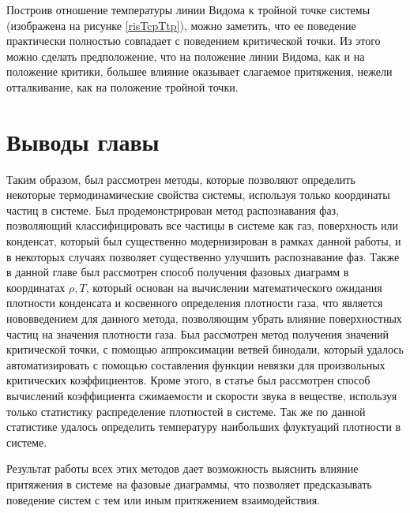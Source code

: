 Построив отношение температуры линии Видома к тройной точке системы (изображена на рисунке \ref{risTcpTtp}), можно заметить, что ее поведение практически полностью совпадает с поведением критической точки. Из этого можно сделать предположение, что на положение линии Видома, как и на положение критики, большее влияние оказывает слагаемое притяжения, нежели отталкивание, как на положение тройной точки. 


\section{Выводы главы}\label{C2_4}

Таким образом, был рассмотрен методы, которые позволяют определить некоторые термодинамические свойства системы, используя только координаты частиц в системе. Был продемонстрирован метод распознавания фаз, позволяющий классифицировать все частицы в системе как газ, поверхность или конденсат, который был существенно модернизирован в рамках данной работы, и в некоторых случаях позволяет существенно улучшить распознавание фаз.
Также в данной главе был рассмотрен способ получения фазовых диаграмм в координатах $\rho, T$, который основан на вычислении математического ожидания плотности конденсата и косвенного определения плотности газа, что является нововведением для данного метода, позволяющим убрать влияние поверхностных частиц на значения плотности газа. 
Был рассмотрен метод получения значений критической точки, с помощью аппроксимации ветвей бинодали, который удалось автоматизировать с помощью составления функции невязки для произвольных критических коэффициентов.
Кроме этого, в статье был рассмотрен способ вычислений коэффициента сжимаемости и скорости звука в веществе, используя только статистику распределение плотностей в системе. Так же по данной статистике удалось определить температуру наибольших флуктуаций плотности в системе.

Результат работы всех этих методов дает возможность выяснить влияние притяжения в системе на фазовые диаграммы, что позволяет предсказывать поведение систем с тем или иным притяжением взаимодействия.
